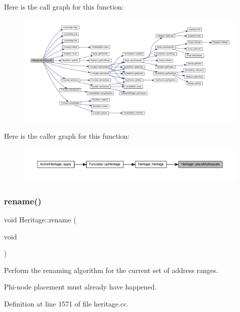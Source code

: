Here is the call graph for this function\+:
\nopagebreak
\begin{figure}[H]
\begin{center}
\leavevmode
\includegraphics[width=350pt]{class_heritage_acf14995e58b23df915ad06e9ff7f1165_cgraph}
\end{center}
\end{figure}
Here is the caller graph for this function\+:
\nopagebreak
\begin{figure}[H]
\begin{center}
\leavevmode
\includegraphics[width=350pt]{class_heritage_acf14995e58b23df915ad06e9ff7f1165_icgraph}
\end{center}
\end{figure}
\mbox{\label{class_heritage_a68d25aa348dd9e8c5f13d708b2310772}} 
\subsubsection{\texorpdfstring{rename()}{rename()}}
{\footnotesize\ttfamily void Heritage\+::rename (\begin{DoxyParamCaption}\item[{void}]{ }\end{DoxyParamCaption})}



Perform the renaming algorithm for the current set of address ranges. 

Phi-\/node placement must already have happened. 

Definition at line 1571 of file heritage.\+cc.

